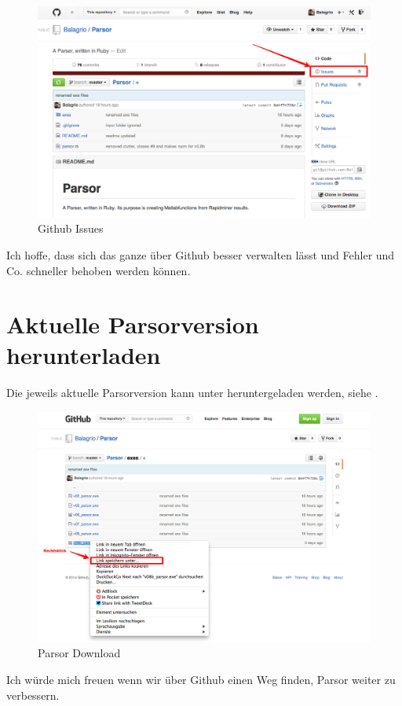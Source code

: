 \documentclass[12pt, a4paper]{scrartcl}
\begin{document}
\begin{figure}[H]
\centering %
\includegraphics[width=\textwidth]{fig/Issues.png} %
\caption{Github Issues} %
\label{fig:issues} %
\end{figure}

Ich hoffe, dass sich das ganze über Github besser verwalten lässt und Fehler und Co. schneller behoben werden können. 

\clearpage
\section{Aktuelle Parsorversion herunterladen}

Die jeweils aktuelle Parsorversion kann unter \cite{parsor} heruntergeladen werden, siehe . \\

\begin{figure}[H]
\centering %
\includegraphics[width=\textwidth]{fig/Speichern.png} %
\caption{Parsor Download} %
\label{fig:speichern} %
\end{figure}

Ich würde mich freuen wenn wir über Github einen Weg finden, Parsor weiter zu verbessern.

\clearpage
\renewcommand{\refname}{\section{Links}}


\end{document}
